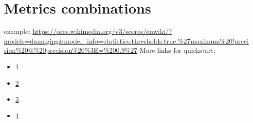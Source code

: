 \documentclass[12pt,a4paper]{article}
\begin{document}
\section{Metrics combinations}
example: \url{https://ores.wikimedia.org/v3/scores/enwiki/?models=damaging&model_info=statistics.thresholds.true.%27maximum%20!precision%20@%20precision%20%3E=%200.9%27}
More links for quickstart:
\begin{itemize}
\item \href{https://ores.wikimedia.org/v3/scores/enwiki/?models=damaging&model_info=statistics.thresholds.true}{1}
\item \href{https://upload.wikimedia.org/wikipedia/commons/2/26/Precisionrecall.svg}{2}
\item \href{https://ores.wikimedia.org/v3/scores/enwiki/?models=damaging&model_info=statistics.thresholds.true.%27maximum%20!precision%20@%20precision%20%3E=%200.9%27}{3}
\item \href{https://ores.wikimedia.org/v3/scores/enwiki/?models=damaging&model_info=statistics.thresholds.true.%27maximum%20filter_rate%20@%20recall%20%3E=%200.75%27}{4}
\end{itemize}
%
%
%
\end{document}
